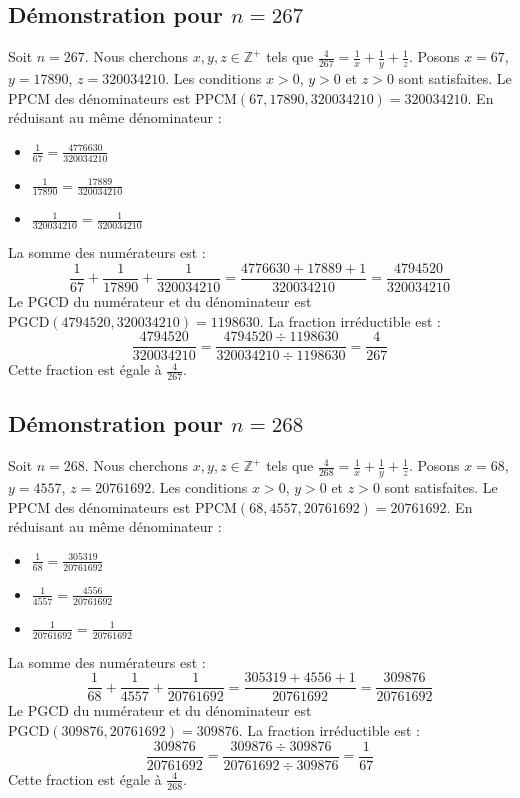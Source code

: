 \documentclass[11pt,a4paper]{article}
\begin{document}
\subsection{Démonstration pour $n = 267$}
Soit $n = 267$. Nous cherchons $x, y, z \in \mathbb{Z}^{+}$ tels que $\frac{4}{267} = \frac{1}{x} + \frac{1}{y} + \frac{1}{z}$.
Posons $x = 67$, $y = 17890$, $z = 320034210$.
Les conditions $x > 0$, $y > 0$ et $z > 0$ sont satisfaites.
Le PPCM des dénominateurs est $\text{PPCM}(67, 17890, 320034210) = 320034210$.
En réduisant au même dénominateur :
\begin{itemize}
    \item $\frac{1}{67} = \frac{4776630}{320034210}$
    \item $\frac{1}{17890} = \frac{17889}{320034210}$
    \item $\frac{1}{320034210} = \frac{1}{320034210}$
\end{itemize}
La somme des numérateurs est :
$$ \frac{1}{67} + \frac{1}{17890} + \frac{1}{320034210} = \frac{4776630 + 17889 + 1}{320034210} = \frac{4794520}{320034210} $$
Le PGCD du numérateur et du dénominateur est $\text{PGCD}(4794520, 320034210) = 1198630$.
La fraction irréductible est :
$$ \frac{4794520}{320034210} = \frac{4794520 \div 1198630}{320034210 \div 1198630} = \frac{4}{267} $$
Cette fraction est égale à $\frac{4}{267}$.

\subsection{Démonstration pour $n = 268$}
Soit $n = 268$. Nous cherchons $x, y, z \in \mathbb{Z}^{+}$ tels que $\frac{4}{268} = \frac{1}{x} + \frac{1}{y} + \frac{1}{z}$.
Posons $x = 68$, $y = 4557$, $z = 20761692$.
Les conditions $x > 0$, $y > 0$ et $z > 0$ sont satisfaites.
Le PPCM des dénominateurs est $\text{PPCM}(68, 4557, 20761692) = 20761692$.
En réduisant au même dénominateur :
\begin{itemize}
    \item $\frac{1}{68} = \frac{305319}{20761692}$
    \item $\frac{1}{4557} = \frac{4556}{20761692}$
    \item $\frac{1}{20761692} = \frac{1}{20761692}$
\end{itemize}
La somme des numérateurs est :
$$ \frac{1}{68} + \frac{1}{4557} + \frac{1}{20761692} = \frac{305319 + 4556 + 1}{20761692} = \frac{309876}{20761692} $$
Le PGCD du numérateur et du dénominateur est $\text{PGCD}(309876, 20761692) = 309876$.
La fraction irréductible est :
$$ \frac{309876}{20761692} = \frac{309876 \div 309876}{20761692 \div 309876} = \frac{1}{67} $$
Cette fraction est égale à $\frac{4}{268}$.
\end{document}
